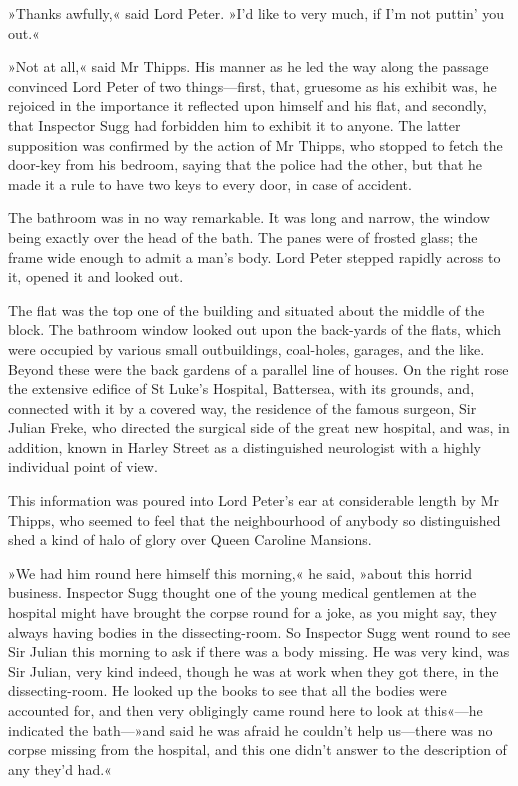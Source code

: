 »Thanks awfully,« said Lord Peter. »I'd like to very much, if I'm not puttin' you out.«

»Not at all,« said Mr Thipps. His manner as he led the way along the passage convinced Lord Peter of two things—first, that, gruesome as his exhibit was, he rejoiced in the importance it reflected upon himself and his flat, and secondly, that Inspector Sugg had forbidden him to exhibit it to anyone. The latter supposition was confirmed by the action of Mr Thipps, who stopped to fetch the door-key from his bedroom, saying that the police had the other, but that he made it a rule to have two keys to every door, in case of accident.

The bathroom was in no way remarkable. It was long and narrow, the window being exactly over the head of the bath. The panes were of frosted glass; the frame wide enough to admit a man's body. Lord Peter stepped rapidly across to it, opened it and looked out.

The flat was the top one of the building and situated about the middle of the block. The bathroom window looked out upon the back-yards of the flats, which were occupied by various small outbuildings, coal-holes, garages, and the like. Beyond these were the back gardens of a parallel line of houses. On the right rose the extensive edifice of St Luke's Hospital, Battersea, with its grounds, and, connected with it by a covered way, the residence of the famous surgeon, Sir Julian Freke, who directed the surgical side of the great new hospital, and was, in addition, known in Harley Street as a distinguished neurologist with a highly individual point of view.

This information was poured into Lord Peter's ear at considerable length by Mr Thipps, who seemed to feel that the neighbourhood of anybody so distinguished shed a kind of halo of glory over Queen Caroline Mansions.

»We had him round here himself this morning,« he said, »about this horrid business. Inspector Sugg thought one of the young medical gentlemen at the hospital might have brought the corpse round for a joke, as you might say, they always having bodies in the dissecting-room. So Inspector Sugg went round to see Sir Julian this morning to ask if there was a body missing. He was very kind, was Sir Julian, very kind indeed, though he was at work when they got there, in the dissecting-room. He looked up the books to see that all the bodies were accounted for, and then very obligingly came round here to look at this«---he indicated the bath---»and said he was afraid he couldn't help us—there was no corpse missing from the hospital, and this one didn't answer to the description of any they'd had.«

